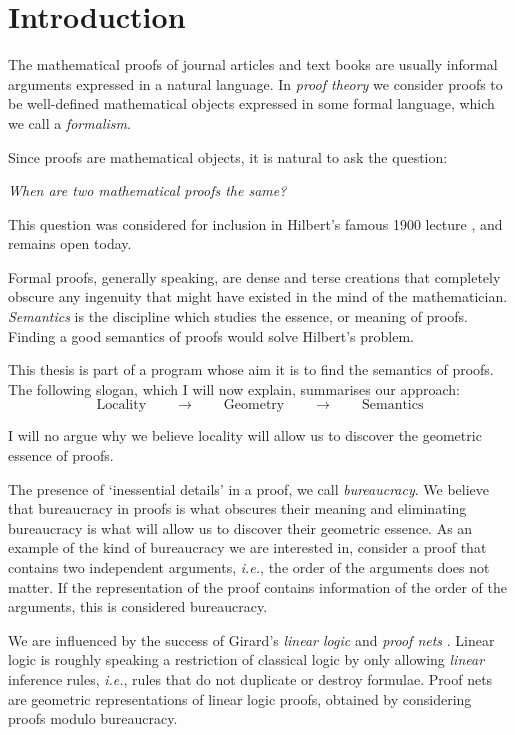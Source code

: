 \chapter{Introduction}

The mathematical proofs of journal articles and text books are usually informal arguments expressed in a natural language. In \emph{proof theory} we consider proofs to be well-defined mathematical objects expressed in some formal language, which we call a \emph{formalism}.

Since proofs are mathematical objects, it is natural to ask the question:

\emph{When are two mathematical proofs the same?}

This question was considered for inclusion in Hilbert's famous 1900 lecture \cite{Thie:03:Hilberts:yu}, and remains open today.

Formal proofs, generally speaking, are dense and terse creations that completely obscure any ingenuity that might have existed in the mind of the mathematician. \emph{Semantics} is the discipline which studies the essence, or meaning of proofs. Finding a good semantics of proofs would solve Hilbert's problem.



This thesis is part of a program whose aim it is to find the semantics of proofs. The following slogan, which I will now explain, summarises our approach:
\[
\mbox{Locality}\qquad\rightarrow\qquad\mbox{Geometry}\qquad\rightarrow\qquad\mbox{Semantics}
\]

I will no argue why we believe locality will allow us to discover the geometric essence of proofs.

The presence of `inessential details' in a proof, we call \emph{bureaucracy}. We believe that bureaucracy in proofs is what obscures their meaning and eliminating bureaucracy is what will allow us to discover their geometric essence. As an example of the kind of bureaucracy we are interested in, consider a proof that contains two independent arguments, \emph{i.e.}, the order of the arguments does not matter. If the representation of the proof contains information of the order of the arguments, this is considered bureaucracy.


We are influenced by the success of Girard's \emph{linear logic} and \emph{proof nets} \cite{Gira:87:Linear-L:wm}. Linear logic is roughly speaking a restriction of classical logic by only allowing \emph{linear} inference rules, \emph{i.e.}, rules that do not duplicate or destroy formulae. Proof nets are geometric representations of linear logic proofs, obtained by considering proofs modulo bureaucracy.

